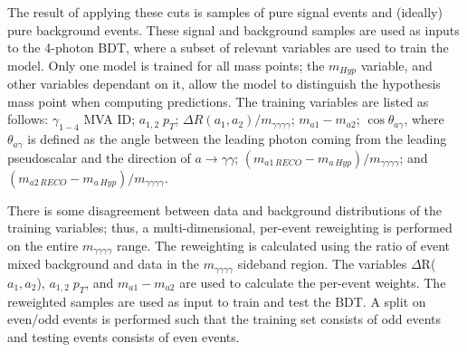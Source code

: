 \documentclass[12pt]{article}
\begin{document}
The result of applying these cuts is samples of pure signal events and (ideally) pure background events. These signal and background samples are used as inputs to the 4-photon BDT, where a subset of relevant variables are used to train the model. Only one model is trained for all mass points; the $m_{Hyp}$ variable, and other variables dependant on it, allow the model to distinguish the hypothesis mass point when computing predictions. The training variables are listed as follows: $\gamma_{1-4}$ MVA ID; $a_{1,2}\; p_T$; $\Delta R(a_{1}, a_{2})/m_{\gamma\gamma\gamma\gamma}$; $m_{a1} - m_{a2}$; $\cos\theta_{a\gamma}$, where $\theta_{a\gamma}$ is defined as the angle between the leading photon coming from the leading pseudoscalar and the direction of $a\rightarrow\gamma\gamma$; $(m_{a1\,RECO} - m_{a\, Hyp})/m_{\gamma\gamma\gamma\gamma}$; and $(m_{a2\,RECO} - m_{a\, Hyp})/m_{\gamma\gamma\gamma\gamma}$.



There is some disagreement between data and background distributions of the training variables; thus, a multi-dimensional, per-event reweighting is performed on the entire $m_{\gamma\gamma\gamma\gamma}$ range. The reweighting is calculated using the ratio of event mixed background and data in the $m_{\gamma\gamma\gamma\gamma}$ sideband region. The variables $\Delta$R($a_1,a_2$), $a_{1,2}\; p_T$, and $m_{a1} - m_{a2}$ are used to calculate the per-event weights. The reweighted samples are used as input to train and test the BDT. A split on even/odd events is performed such that the training set consists of odd events and testing events consists of even events.\par
\end{document}
